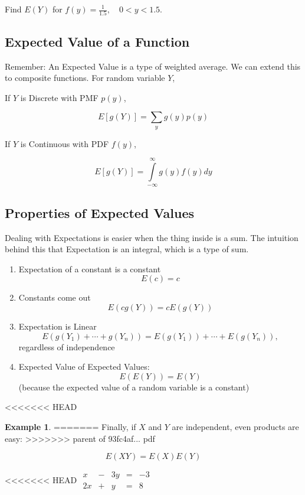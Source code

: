 \documentclass[]{book}
\providecommand{\tightlist}{%
  \setlength{\itemsep}{0pt}\setlength{\parskip}{0pt}}
\theoremstyle{definition}
\theoremstyle{definition}
\newtheorem{example}{Example}[chapter]
\theoremstyle{definition}
\theoremstyle{remark}
\begin{document}
Find \(E(Y)\) for \(f(y)=\frac{1}{1.5}, \quad 0<y<1.5\).

\hypertarget{expected-value-of-a-function}{%
\subsection*{Expected Value of a Function}\label{expected-value-of-a-function}}

Remember: An Expected Value is a type of weighted average. We can extend this to composite functions. For random variable \(Y\),

If \(Y\) is Discrete with PMF \(p(y)\),

\[E[g(Y)]=\sum\limits_y g(y)p(y)\]

If \(Y\) is Continuous with PDF \(f(y)\),

\[E[g(Y)]=\int\limits_{-\infty}^\infty g(y)f(y)dy\]

\hypertarget{properties-of-expected-values}{%
\subsection*{Properties of Expected Values}\label{properties-of-expected-values}}

Dealing with Expectations is easier when the thing inside is a sum. The intuition behind this that Expectation is an integral, which is a type of sum.

\begin{enumerate}
\def\labelenumi{\arabic{enumi}.}
\tightlist
\item
  Expectation of a constant is a constant \[E(c)=c\]
\item
  Constants come out \[E(c g(Y))= c E(g(Y))\]
\item
  Expectation is Linear \[E(g(Y_1) + \cdots + g(Y_n))=E(g(Y_1)) +\cdots+E(g(Y_n)),\] regardless of independence
\item
  Expected Value of Expected Values: \[E(E(Y)) = E(Y)\] (because the expected value of a random variable is a constant)
\end{enumerate}

<<<<<<< HEAD
\begin{example}
\protect\hypertarget{exm:solvesys}{}{\label{exm:solvesys} }
=======
Finally, if \(X\) and \(Y\) are independent, even products are easy:
>>>>>>> parent of 93fc4af... pdf

\[E(XY) = E(X)E(Y)\]

<<<<<<< HEAD
\(\begin{matrix}  x & - & 3y & = & -3\\  2x & + & y & = & 8  \end{matrix}\)
\end{example}
\end{document}
